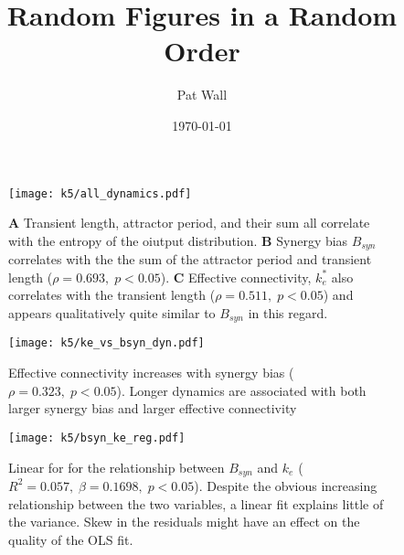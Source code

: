 \documentclass[12 pt]{article}
\title{Random Figures in a Random Order}
\author{Pat Wall}
\date{\today}
\begin{document}
\maketitle

\begin{figure}
    \texttt{[image: k5/all\_dynamics.pdf]}
    \caption{\textbf{A} Transient length, attractor period, and their sum all 
    correlate with the entropy of the oiutput distribution. \textbf{B} Synergy 
    bias $B_{syn}$ correlates with the the sum of the attractor period and 
    transient length ($\rho=0.693, \; p<0.05$). \textbf{C} Effective
    connectivity, $k_e^*$ also correlates with the 
    transient length ($\rho=0.511, \; p<0.05$) and appears qualitatively quite
    similar to $B_{syn}$ in this regard.}
    \label{fig:dynamics}
\end{figure}

\begin{figure}
    \texttt{[image: k5/ke\_vs\_bsyn\_dyn.pdf]}
    \caption{Effective connectivity increases with synergy bias ($\rho=0.323,\; p<0.05$).
             Longer dynamics are associated with both larger synergy bias and larger
             effective connectivity}
    \label{fig:ke-bsyn}
\end{figure}

\begin{figure}
    \texttt{[image: k5/bsyn\_ke\_reg.pdf]}
    \caption{Linear for for the relationship between $B_{syn}$ and $k_e$ 
             ($R^2 = 0.057, \; \beta = 0.1698, \; p < 0.05$). Despite the obvious
             increasing relationship between the two variables, a linear fit
             explains little of the variance. Skew in the residuals might have
             an effect on the quality of the OLS fit.}
    \label{fig:regression}
\end{figure}
\end{document}
